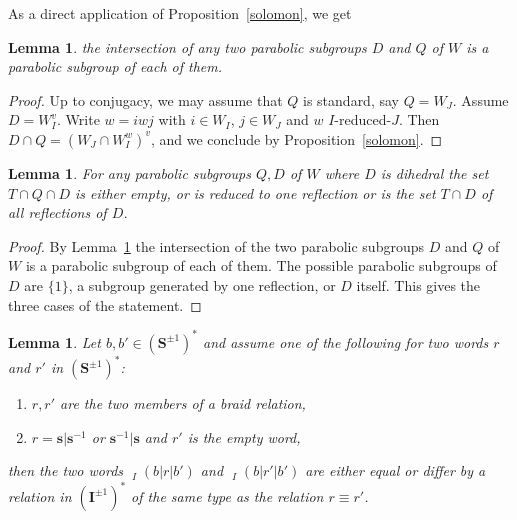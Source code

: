 \documentclass{amsart}
\numberwithin{equation}{section}
\newtheorem{lemma}[equation]{Lemma}
\newcommand\inv{^{-1}}
\newcommand\bs{{\mathbf s}}
\newcommand\bI{{\mathbf I}}
\newcommand\bS{{\mathbf S}}
\DeclareMathOperator\hpi{\hat\pi}
\begin{document}
As a direct application of Proposition~\ref{solomon},  we get
\begin{lemma}\label{solomon2} 
the  intersection of any two parabolic
subgroups  $D$ and $Q$ of $W$ is a parabolic subgroup of each of them.
\end{lemma}
\begin{proof} Up to conjugacy, we may assume that $Q$ is standard, say $Q =
W_J$.  Assume $D = W_I^v$. Write $w =  iwj$ with $i\in W_I$, $j\in W_J$ and
$w$ $I$-reduced-$J$. Then $D\cap Q = (W_J\cap W_I^w)^v$, and we conclude by
Proposition~\ref{solomon}.
\end{proof}
\begin{lemma}\label{intersection parabolics}
For any parabolic subgroups $Q,D$ of $W$ where $D$ is dihedral
the set $T\cap Q\cap D$ is either empty, or is reduced to one
reflection or is the set $T\cap D$ of all reflections of $D$.
\end{lemma}
\begin{proof}
By Lemma~\ref{solomon2}  the  intersection of the two parabolic
subgroups  $D$ and $Q$ of $W$ is a parabolic subgroup of each of them. The
possible  parabolic subgroups of  $D$ are $\{1\}$,  a subgroup generated by
one reflection, or $D$ itself. This gives the three cases of the statement.
\end{proof}
\begin{lemma} \label{braid relation} Let $b,b'\in(\bS^{\pm1})^*$ and assume
one of the following for two words $r$ and $r'$ in $(\bS^{\pm1})^*$:
\begin{enumerate}
\item $r,r'$ are the two members of a braid relation,
\item $r=\bs|\bs\inv$ or
$\bs\inv|\bs$ and $r'$ is the empty word,
\end{enumerate}
then the two words 
$\hpi_I(b|r|b')$ and $\hpi_I(b|r'|b')$ are either equal or differ by a 
relation  in $(\bI^{\pm1})^*$ of the same type as the relation $r\equiv r'$.
\end{lemma}
\end{document}
